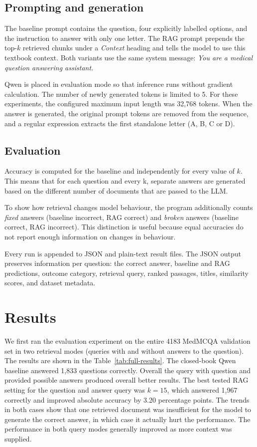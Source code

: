 \documentclass{article}
\begin{document}
\subsection{Prompting and generation}

The baseline prompt contains the question, four explicitly labelled options, and
the instruction to answer with only one letter. The RAG prompt prepends the top-$k$
retrieved chunks under a \emph{Context} heading and tells the model to use this
textbook context. Both variants use the same system message: \emph{You are a
medical question answering assistant.}

Qwen is placed in evaluation mode so that inference runs without gradient calculation.
The number of newly generated tokens is limited to 5.
For these experiments, the configured maximum input length was 32,768 tokens.
When the answer is generated, the original prompt tokens are removed from the
sequence, and a regular expression extracts the first standalone letter (A, B, C or D).

\subsection{Evaluation}

Accuracy is computed for the baseline and independently for every value of $k$.
This means that for each question and every k, separate answers are generated 
based on the different number of documents that are passed to the LLM. 

To show how retrieval changes model behaviour, the program additionally counts
\emph{fixed} answers (baseline incorrect, RAG correct) and \emph{broken} answers
(baseline correct, RAG incorrect). This distinction is useful because equal
accuracies do not report enough information on changes in behaviour. 

Every run is appended to JSON and plain-text result files.
The JSON output preserves information per question:
the correct answer, baseline and RAG predictions, outcome
category, retrieval query, ranked passages, titles, similarity scores, and dataset
metadata.

\section{Results}
We first ran the evaluation experiment on the entire 4183 MedMCQA validation set in 
two retrieval modes (queries with and without answers to the question). 
The results are shown in the Table~\ref{tab:full-results}. 
The closed-book Qwen baseline answered 1,833 questions correctly.
Overall the query with question and provided possible answers produced
overall better results. 
The best tested RAG setting for the question and answer query was $k=15$,
which answered 1,967 correctly and improved absolute accuracy by 3.20 percentage points.
The trends in both cases show that one retrieved document was insufficient
for the model to generate the correct answer, in which case it actually hurt
the performance. The performance in both query modes generally improved 
as more context was supplied. 
\end{document}
